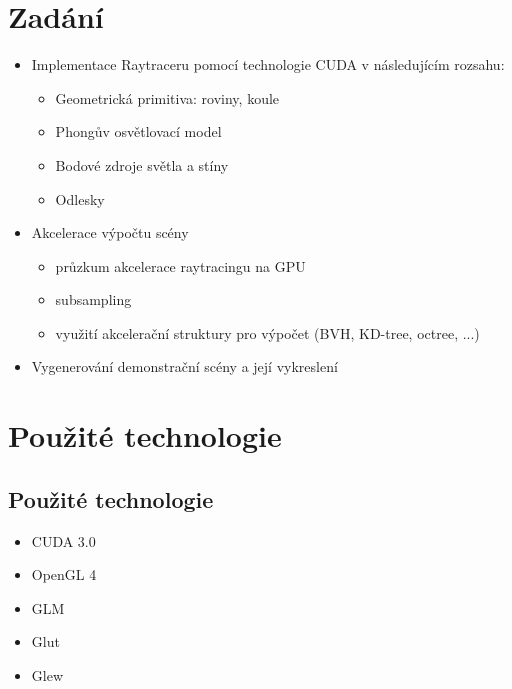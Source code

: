\documentclass[12pt,a4paper,titlepage,final]{report}
\begin{document}
	\def\authora{Jan Bureš}
	\def\authorb{Pavel Macenauer}
	\def\emaila{xbures19@stud.fit.vutbr.cz}
	\def\emailb{xmacen02@stud.fit.vutbr.cz}
	\def\docname{Počítačová grafika}
	\def\projname{Raytracing na CUDA}
	
	\newpage
	\pagestyle{plain}
	\setcounter{page}{1}
	\setcounter{secnumdepth}{-1}
	\setlength{\parindent}{1cm}	

\section{Zadání}

\begin{itemize}
	\item Implementace Raytraceru pomocí technologie CUDA v následujícím rozsahu:
	\begin{itemize}
		\item Geometrická primitiva: roviny, koule
		\item Phongův osvětlovací model
		\item Bodové zdroje světla a stíny
		\item Odlesky
	\end{itemize}
	\item Akcelerace výpočtu scény
	\begin{itemize}
		\item průzkum akcelerace raytracingu na GPU
		\item subsampling
		\item využití akcelerační struktury pro výpočet (BVH, KD-tree, octree, ...)
	\end{itemize}
	\item Vygenerování demonstrační scény a její vykreslení
\end{itemize}

\section{Použité technologie}

\subsection{Použité technologie}
\begin{itemize}
	\item CUDA 3.0
	\item OpenGL 4
	\item GLM
	\item Glut
	\item Glew
\end{itemize}
\end{document}
